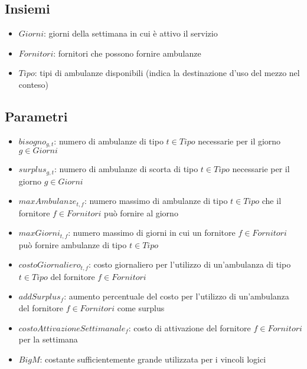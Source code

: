 \subsection{Insiemi}
\begin{itemize}
    \item $Giorni$: giorni della settimana in cui è attivo il servizio
    \item $Fornitori$: fornitori che possono fornire ambulanze
    \item $Tipo$: tipi di ambulanze disponibili (indica la destinazione d'uso del mezzo nel conteso)
\end{itemize}
\subsection{Parametri}
\begin{itemize}
    \item $bisogno_{g, t}$: numero di ambulanze di tipo $t \in Tipo$ necessarie per il giorno $g \in Giorni$
    \item $surplus_{g, t}$: numero di ambulanze di scorta di tipo $t \in Tipo$ necessarie per il giorno $g \in Giorni$
    \item $maxAmbulanze_{t, f}$: numero massimo di ambulanze di tipo $t \in Tipo$ che il fornitore $f \in Fornitori$ può fornire al giorno
    \item $maxGiorni_{t, f}$: numero massimo di giorni in cui un fornitore $f \in Fornitori$ può fornire ambulanze di tipo $t \in Tipo$
    \item $costoGiornaliero_{t, f}$: costo giornaliero per l'utilizzo di un'ambulanza di tipo $t \in Tipo$ del fornitore $f \in Fornitori$
    \item $addSurplus_{f}$: aumento percentuale del costo per l'utilizzo di un'ambulanza del fornitore $f \in Fornitori$ come surplus
    \item $costoAttivazioneSettimanale_{f}$: costo di attivazione del fornitore $f \in Fornitori$ per la settimana
    \item $BigM$: costante sufficientemente grande utilizzata per i vincoli logici
\end{itemize}
